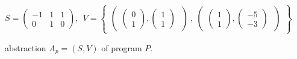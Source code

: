 
\begin{figure}
\[
    S = \begin{pmatrix}
        -1 & 1 & 1 \\
        0 & 1 & 0
    \end{pmatrix}, \ \
    V = \begin{Bmatrix}
        \begin{pmatrix}
              \begin{pmatrix}
                    0 \\
                    1
               \end{pmatrix},
               \begin{pmatrix}
                     1 \\
                     1
               \end{pmatrix}
        \  \end{pmatrix}\ , \
        \begin{pmatrix}
               \begin{pmatrix}
                    1 \\
                    1
               \end{pmatrix},
               \begin{pmatrix}
                    -5 \\
                    -3
              \end{pmatrix}
        \ \end{pmatrix}
    \end{Bmatrix}
\]
\caption{\qvasr abstraction $A_p = (S, V)$ of program $P$.}
\end{figure}